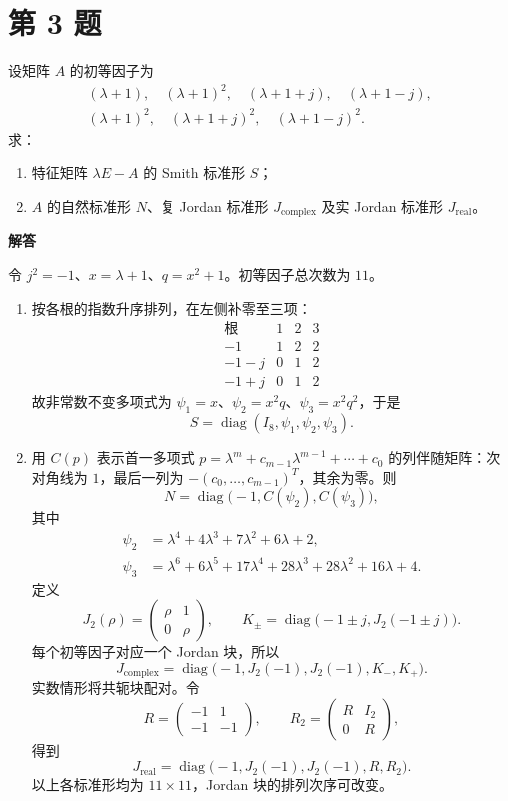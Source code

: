 \documentclass[UTF8,10pt,letterpaper,fontset=fandol]{ctexart}
\newcommand{\Solution}{\par\Needspace{4\baselineskip}\textbf{解答}\par}
\begin{document}
\newpage
\section{第 3 题}
设矩阵 $A$ 的初等因子为
\[
\begin{gathered}
(\lambda+1),\quad(\lambda+1)^2,\quad(\lambda+1+j),\quad(\lambda+1-j),\\
(\lambda+1)^2,\quad(\lambda+1+j)^2,\quad(\lambda+1-j)^2.
\end{gathered}
\]
求：
\begin{enumerate}
\item 特征矩阵 $\lambda E-A$ 的 Smith 标准形 $S$；
\item $A$ 的自然标准形 $N$、复 Jordan 标准形 $J_{\mathrm{complex}}$ 及实 Jordan 标准形 $J_{\mathrm{real}}$。
\end{enumerate}
\Solution
令 $j^2=-1$、$x=\lambda+1$、$q=x^2+1$。初等因子总次数为 $11$。
\begin{enumerate}
\item 按各根的指数升序排列，在左侧补零至三项：
\[
\begin{array}{c|ccc}
\text{根}&1&2&3\\\hline
-1&1&2&2\\
-1-j&0&1&2\\
-1+j&0&1&2
\end{array}
\]
故非常数不变多项式为 $\psi_1=x$、$\psi_2=x^2q$、$\psi_3=x^2q^2$，于是
\[
\boxed{S=\operatorname{diag}(I_8,\psi_1,\psi_2,\psi_3)}.
\]
\item 用 $C(p)$ 表示首一多项式 $p=\lambda^m+c_{m-1}\lambda^{m-1}+\cdots+c_0$ 的列伴随矩阵：次对角线为 $1$，最后一列为 $-(c_0,\ldots,c_{m-1})^T$，其余为零。则
\[
\boxed{N=\operatorname{diag}\bigl(-1,C(\psi_2),C(\psi_3)\bigr)},
\]
其中
\[
\begin{aligned}
\psi_2&=\lambda^4+4\lambda^3+7\lambda^2+6\lambda+2,\\
\psi_3&=\lambda^6+6\lambda^5+17\lambda^4+28\lambda^3+28\lambda^2+16\lambda+4.
\end{aligned}
\]
定义
\[
J_2(\rho)=\begin{pmatrix}\rho&1\\0&\rho\end{pmatrix},\qquad
K_\pm=\operatorname{diag}\bigl(-1\pm j,J_2(-1\pm j)\bigr).
\]
每个初等因子对应一个 Jordan 块，所以
\[
\boxed{J_{\mathrm{complex}}=\operatorname{diag}\bigl(-1,J_2(-1),J_2(-1),K_-,K_+\bigr)}.
\]
实数情形将共轭块配对。令
\[
R=\begin{pmatrix}-1&1\\-1&-1\end{pmatrix},\qquad
R_2=\begin{pmatrix}R&I_2\\0&R\end{pmatrix},
\]
得到
\[
\boxed{J_{\mathrm{real}}=\operatorname{diag}\bigl(-1,J_2(-1),J_2(-1),R,R_2\bigr)}.
\]
以上各标准形均为 $11\times11$，Jordan 块的排列次序可改变。
\end{enumerate}
\end{document}
